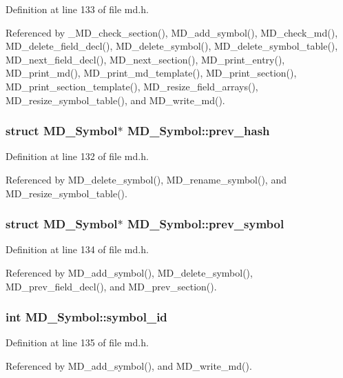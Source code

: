 Definition at line 133 of file md.h.

Referenced by \_\-MD\_\-check\_\-section(), MD\_\-add\_\-symbol(), MD\_\-check\_\-md(), MD\_\-delete\_\-field\_\-decl(), MD\_\-delete\_\-symbol(), MD\_\-delete\_\-symbol\_\-table(), MD\_\-next\_\-field\_\-decl(), MD\_\-next\_\-section(), MD\_\-print\_\-entry(), MD\_\-print\_\-md(), MD\_\-print\_\-md\_\-template(), MD\_\-print\_\-section(), MD\_\-print\_\-section\_\-template(), MD\_\-resize\_\-field\_\-arrays(), MD\_\-resize\_\-symbol\_\-table(), and MD\_\-write\_\-md().
\subsubsection{\setlength{\rightskip}{0pt plus 5cm}struct \bf{MD\_\-Symbol}$\ast$ \bf{MD\_\-Symbol::prev\_\-hash}}\label{structMD__Symbol_d4b9cf7a04204f6e0cfb1b29e693c089}




Definition at line 132 of file md.h.

Referenced by MD\_\-delete\_\-symbol(), MD\_\-rename\_\-symbol(), and MD\_\-resize\_\-symbol\_\-table().
\subsubsection{\setlength{\rightskip}{0pt plus 5cm}struct \bf{MD\_\-Symbol}$\ast$ \bf{MD\_\-Symbol::prev\_\-symbol}}\label{structMD__Symbol_97cd3a9db1382c4dba49122e7942324d}




Definition at line 134 of file md.h.

Referenced by MD\_\-add\_\-symbol(), MD\_\-delete\_\-symbol(), MD\_\-prev\_\-field\_\-decl(), and MD\_\-prev\_\-section().
\subsubsection{\setlength{\rightskip}{0pt plus 5cm}int \bf{MD\_\-Symbol::symbol\_\-id}}\label{structMD__Symbol_a13b04c534db0ff11bb0780f647e678f}




Definition at line 135 of file md.h.

Referenced by MD\_\-add\_\-symbol(), and MD\_\-write\_\-md().

